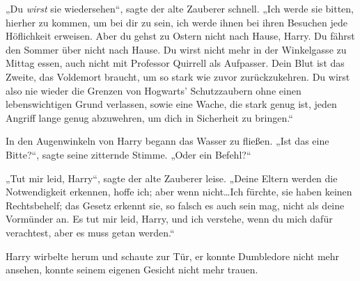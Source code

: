 „Du \emph{wirst} sie wiedersehen“, sagte der alte Zauberer schnell.
„Ich werde sie bitten, hierher zu kommen, um bei dir zu sein, ich werde ihnen bei ihren Besuchen jede Höflichkeit erweisen. Aber du gehst zu Ostern nicht nach Hause, Harry. Du fährst den Sommer über nicht nach Hause. Du wirst nicht mehr in der Winkelgasse zu Mittag essen, auch nicht mit Professor Quirrell als Aufpasser. Dein Blut ist das Zweite, das Voldemort braucht, um so stark wie zuvor zurückzukehren. Du wirst also nie wieder die Grenzen von Hogwarts’ Schutzzaubern ohne einen lebenswichtigen Grund verlassen, sowie eine Wache, die stark genug ist, jeden Angriff lange genug abzuwehren, um dich in Sicherheit zu bringen.“

In den Augenwinkeln von Harry begann das Wasser zu fließen.
„Ist das eine Bitte?“, sagte seine zitternde Stimme.
„Oder ein Befehl?“

„Tut mir leid, Harry“, sagte der alte Zauberer leise.
„Deine Eltern werden die Notwendigkeit erkennen, hoffe ich; aber wenn nicht…Ich fürchte, sie haben keinen Rechtsbehelf; das Gesetz erkennt sie, so falsch es auch sein mag, nicht als deine Vormünder an. Es tut mir leid, Harry, und ich verstehe, wenn du mich dafür verachtest, aber es muss getan werden.“

Harry wirbelte herum und schaute zur Tür, er konnte Dumbledore nicht mehr ansehen, konnte seinem eigenen Gesicht nicht mehr trauen.

